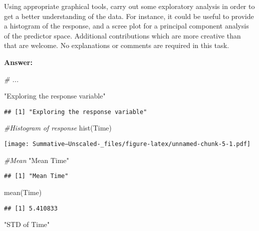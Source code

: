 \documentclass[
]{article}
\newenvironment{Shaded}{\begin{snugshade}}{\end{snugshade}}
\newcommand{\CommentTok}[1]{\textcolor[rgb]{0.56,0.35,0.01}{\textit{#1}}}
\newcommand{\FunctionTok}[1]{\textcolor[rgb]{0.00,0.00,0.00}{#1}}
\newcommand{\NormalTok}[1]{#1}
\newcommand{\StringTok}[1]{\textcolor[rgb]{0.31,0.60,0.02}{#1}}
\begin{document}
Using appropriate graphical tools, carry out some exploratory analysis
in order to get a better understanding of the data. For instance, it
could be useful to provide a histogram of the response, and a scree plot
for a principal component analysis of the predictor space. Additional
contributions which are more creative than that are welcome. No
explanations or comments are required in this task.

\textbf{Answer:}

\begin{Shaded}
\begin{Highlighting}[]
\CommentTok{\# ...}

\StringTok{"Exploring the response variable"}
\end{Highlighting}
\end{Shaded}

\begin{verbatim}
## [1] "Exploring the response variable"
\end{verbatim}

\begin{Shaded}
\begin{Highlighting}[]
\CommentTok{\#Histogram of response}
\FunctionTok{hist}\NormalTok{(Time) }
\end{Highlighting}
\end{Shaded}

\texttt{[image: Summative--Unscaled-\_files/figure-latex/unnamed-chunk-5-1.pdf]}

\begin{Shaded}
\begin{Highlighting}[]
\CommentTok{\#Mean}
\StringTok{"Mean Time"}
\end{Highlighting}
\end{Shaded}

\begin{verbatim}
## [1] "Mean Time"
\end{verbatim}

\begin{Shaded}
\begin{Highlighting}[]
\FunctionTok{mean}\NormalTok{(Time)}
\end{Highlighting}
\end{Shaded}

\begin{verbatim}
## [1] 5.410833
\end{verbatim}

\begin{Shaded}
\begin{Highlighting}[]
\StringTok{"STD of Time"}
\end{Highlighting}
\end{Shaded}
\end{document}
